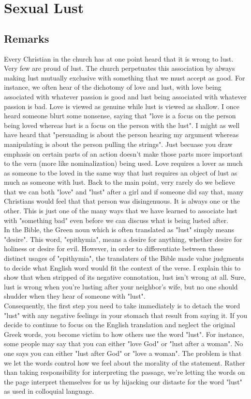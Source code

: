 \documentclass[a4paper, parskip=full, 12pt]{article}
\begin{document}
\section*{Sexual Lust}
\subsection{Remarks}
Every Christian in the church has at one point heard that it is wrong to lust. Very few are proud of lust. The church perpetuates this association by always making lust mutually exclusive with something that we must accept as good. For instance, we often hear of the dichotomy of love and lust, with love being associated with whatever passion is good and lust being associated with whatever passion is bad. Love is viewed as genuine while lust is viewed as shallow. I once heard someone blurt some nonsense, saying that "love is a focus on the person being loved whereas lust is a focus on the person with the lust". I might as well have heard that "persuading is about the person hearing my argument whereas manipulating is about the person pulling the strings". Just becuase you draw emphasis on certain parts of an action doesn't make those parts more important to the vern (more like nominalization) being used. Love requires a lover as much as someone to tbe loved in the same way that lust requires an object of lust as much as someone with lust. Back to the main point, very rarely do we believe that we can both "love" and "lust" after a girl and if someone did say that, many Christians would feel that that person was disingenuous. It is always one or the other. This is just one of the many ways that we have learned to associate lust with "something bad" even before we can discuss what is being lusted after. \\
\break
In the Bible, the Green noun which is often translated as "lust" simply means "desire". This word, "epithymia", means a desire for anything, whether desire for holiness or desire for evil. However, in order to differentiate between these distinct usages of "epithymia", the translaters of the Bible made value judgments to decide what English word would fit the context of the verse. I explain this to show that when stripped of its negative connotation, lust isn't wrong at all. Sure, lust is wrong when you're lusting after your neighbor's wife, but no one should shudder when they hear of someone with "lust". \\
\break
Consequently, the first step you need to take immediately is to detach the word "lust" with any negative feelings in your stomach that result from saying it. If you decide to continue to focus on the English translation and neglect the original Greek words, you become victim to how others use the word "lust". For instance, some people may say that you can either "love God" or "lust after a woman". No one says you can either "lust after God" or "love a woman". The problem is that we let the words control how we feel about the morality of the statement. Rather than taking responsibility for interpreting the passage, we're letting the words on the page interpret themselves for us by hijacking our distaste for the word "lust" as used in colloquial language. \\
\end{document}
